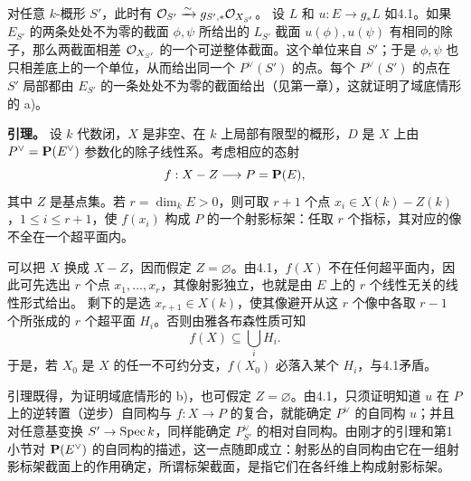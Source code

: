 对任意 \(k\)-概形 \(S'\)，此时有 \(\mathcal O_{S'}\xrightarrow{\sim}g_{S',*}\mathcal O_{X_{S'}}\)。
设 \(L\) 和 \(u:E\to g_*L\) 如4.1。如果 \(E_{S'}\) 的两条处处不为零的截面 \(\phi,\psi\) 所给出的 \(L_{S'}\) 截面 \(u(\phi),u(\psi)\) 有相同的除子，那么两截面相差 \(\mathcal O_{X_{S'}}\) 的一个可逆整体截面。这个单位来自 \(S'\)；于是 \(\phi,\psi\) 也只相差底上的一个单位，从而给出同一个 \(P^\vee(S')\) 的点。每个 \(P^\vee(S')\) 的点在 \(S'\) 局部都由 \(E_{S'}\) 的一条处处不为零的截面给出（见第一章），这就证明了域底情形的 a)。

\medskip\noindent\textbf{引理。}
设 \(k\) 代数闭，\(X\) 是非空、在 \(k\) 上局部有限型的概形，\(D\) 是 \(X\) 上由 \(P^\vee=\mathbf P(E^\vee)\) 参数化的除子线性系。考虑相应的态射
\[
 f:X-Z\longrightarrow P=\mathbf P(E),
\]
其中 \(Z\) 是基点集。若 \(r=\dim_k E>0\)，则可取 \(r+1\) 个点 \(x_i\in X(k)-Z(k)\)，\(1\leq i\leq r+1\)，使 \(f(x_i)\) 构成 \(P\) 的一个射影标架：任取 \(r\) 个指标，其对应的像不全在一个超平面内。

可以把 \(X\) 换成 \(X-Z\)，因而假定 \(Z=\varnothing\)。由4.1，\(f(X)\) 不在任何超平面内，因此可先选出 \(r\) 个点 \(x_1,\ldots,x_r\)，其像射影独立，也就是由 \(E\) 上的 \(r\) 个线性无关的线性形式给出。
剩下的是选 \(x_{r+1}\in X(k)\)，使其像避开从这 \(r\) 个像中各取 \(r-1\) 个所张成的 \(r\) 个超平面 \(H_i\)。否则由雅各布森性质可知
\[
 f(X)\subseteq\bigcup_i H_i .
\]
于是，若 \(X_0\) 是 \(X\) 的任一不可约分支，\(f(X_0)\) 必落入某个 \(H_i\)，与4.1矛盾。

引理既得，为证明域底情形的 b)，也可假定 \(Z=\varnothing\)。由4.1，只须证明知道 \(u\) 在 \(P\) 上的逆转置（逆步）自同构与 \(f:X\to P\) 的复合，就能确定 \(P^\vee\) 的自同构 \(u\)；并且对任意基变换 \(S'\to\operatorname{Spec} k\)，同样能确定 \(P^\vee_{S'}\) 的相对自同构。由刚才的引理和第1小节对 \(\mathbf P(E^\vee)\) 的自同构的描述，这一点随即成立：射影丛的自同构由它在一组射影标架截面上的作用确定，所谓标架截面，是指它们在各纤维上构成射影标架。
\par\endgroup
